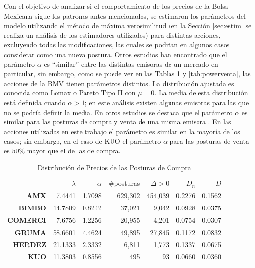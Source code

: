 \documentclass[11pt]{article}
\numberwithin{equation}{section} %
\begin{document}
Con el objetivo de analizar si el comportamiento de los precios de la Bolsa Mexicana sigue los patrones antes mencionados, se estimaron los parámetros del modelo utilizando el método de máxima verosimilitud (en la Sección \ref{sec:estim} se realiza un análisis de los estimadores utilizados) para distintas acciones, excluyendo todas las modificaciones, las cuales se podrían en algunos casos considerar como una nueva postura. Otros estudios han encontrado que el parámetro $\alpha$ es ``similar'' entre las distintas emisoras \cite{zovko2002power} de un mercado en particular, sin embargo, como se puede ver en las Tablas \ref{tab:powercompra} y \ref{tab:powerventa}, las acciones de la BMV tienen parámetros distintos. La distribución ajustada es conocida como Lomax o Pareto Tipo II con $\mu=0$. La media de esta distribución está definida cuando $\alpha>1$; en este análisis existen algunas emisoras para las que no se podría definir la media. En otros estudios se destaca que el parámetro $\alpha$ es similar para las posturas de compra y venta de una misma emisora \cite{Bouchaud2002}. En las acciones utilizadas en este trabajo el parámetro es similar en la mayoría de los casos; sin embargo, en el caso de KUO el parámetro $\alpha$ para las posturas de venta es 50\% mayor que el de las de compra.\\

\begin{table}[htbp]
\centering
\caption{Distribución de Precios de las Posturas de Compra}
\renewcommand{\arraystretch}{1.2}
\begin{tabular}{r|r|r|r|r|r|r|}
\cline{2-7}
& $\lambda$ & $\alpha$ & \#posturas & $\Delta>0$ & $D_n$ & $\bar{D}$ \\
\cline{2-7}
\textbf{AMX}   & 7.4441 & 1.7098 & 629,302 & 454,039 & 0.2276 & 0.1562 \\
\textbf{BIMBO} & 14.7809 & 0.8242 & 37,021 & 9,042 & 0.0928 & 0.0375 \\
\textbf{COMERCI}   & 7.6756 & 1.2256 & 20,955 & 4,201 & 0.0754 & 0.0307 \\
\textbf{GRUMA} & 58.6601 & 4.4624 & 49,895 & 27,845 & 0.1172 & 0.0832 \\
\textbf{HERDEZ} & 21.1333 & 2.3332 & 6,811 & 1,773 & 0.1337 & 0.0675 \\
\textbf{KUO}   & 11.3803 & 0.8556 & 495 & 93 & 0.0660 & 0.0360 \\
\cline{2-7}
\end{tabular}%
\label{tab:powercompra}%
\end{table}%
\end{document}

